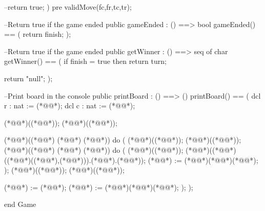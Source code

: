 \begin{vdm_al}
     
    --return true;
   )
   pre validMove(fc,fr,tc,tr);
    
  --Return true if the game ended
  public gameEnded : () ==> bool
   gameEnded() ==
   (
    return finish;
   );
   
  --Return true if the game ended
  public getWinner : () ==> seq of char
   getWinner() ==
   (
    if finish = true
     then return turn;
    
    return "null";
   );
  
  --Print board in the console 
  public printBoard : () ==> ()
   printBoard() ==
   (
    dcl r : nat := (*@@*);
    dcl c : nat := (*@@*);
    
    (*@@*)((*@@*));
    (*@@*)((*@@*));
    
    (*@@*)((*@@*) (*@\notcovered{<}@*) (*@@*)) do
    (
     (*@@*)((*@@*)); (*@@*)((*@@*));
     (*@@*)((*@@*) (*@\notcovered{<}@*) (*@@*)) do
     (
      (*@@*)((*@@*));
      (*@@*)((*@@*)((*@@*)((*@@*),(*@@*))).(*@@*).(*@@*));
      (*@@*) := (*@@*)(*@\notcovered{+}@*)(*@@*);
     );
     (*@@*)((*@@*));
     (*@@*)((*@@*));
     
     (*@@*) := (*@@*);
     (*@@*) := (*@@*)(*@\notcovered{+}@*)(*@@*);
    );
   );
   
end Game
\end{vdm_al}
\bigskip
